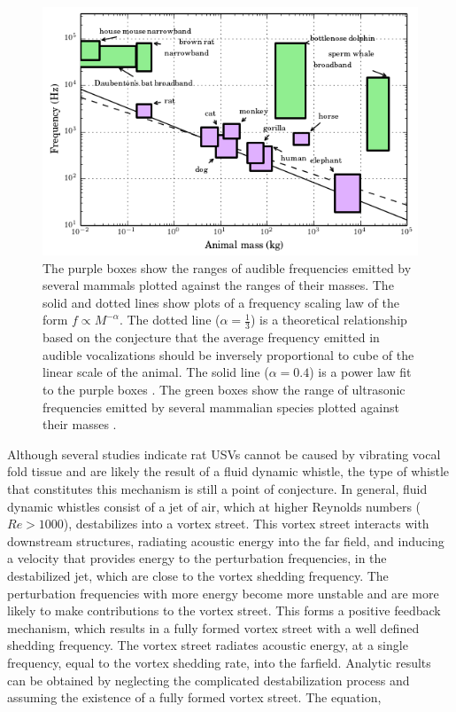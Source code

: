 \documentclass[twocolumn, prl]{revtex4}
\begin{document}
\begin{figure}[!ht]
\centering
\includegraphics[width=\columnwidth]{frequency_scaling.png}
\caption{\label{fig:frequency_scaling} The purple boxes show the ranges of audible frequencies emitted by several mammals plotted against the ranges of their masses. The solid and dotted lines show plots of a frequency scaling law of the form $f\propto M^{-\alpha}$. The dotted line ($\alpha=\frac{1}{3}$) is a theoretical relationship based on the conjecture that the average frequency emitted in audible vocalizations should be inversely proportional to cube of the linear scale of the animal. The solid line ($\alpha=0.4$) is a power law fit to the purple boxes \cite{Brudzynski2010}. The green boxes show the range of ultrasonic frequencies emitted by several mammalian species plotted against their masses \cite{white1998,berry1970natural,Fenton1998,Jones2006,bogdanowicz1994,Frankel2009,Whitehead2009}.}
\end{figure}
Although several studies indicate rat USVs cannot be caused by vibrating vocal fold tissue and are likely the result of a fluid dynamic whistle, the type of whistle that constitutes this mechanism is still a point of conjecture. In general, fluid dynamic whistles consist of a jet of air, which at higher Reynolds numbers ($Re>1000$), destabilizes into a vortex street. This vortex street interacts with downstream structures, radiating acoustic energy into the far field, and inducing a velocity that provides energy to the perturbation frequencies, in the destabilized jet, which are close to the vortex shedding frequency. The perturbation frequencies with more energy become more unstable and are more likely to make contributions to the vortex street. This forms a positive feedback mechanism, which results in a fully formed vortex street with a well defined shedding frequency. The vortex street radiates acoustic energy, at a single frequency, equal to the vortex shedding rate, into the farfield. Analytic results can be obtained by neglecting the complicated destabilization process and assuming the existence of a fully formed vortex street. The equation,
\end{document}
